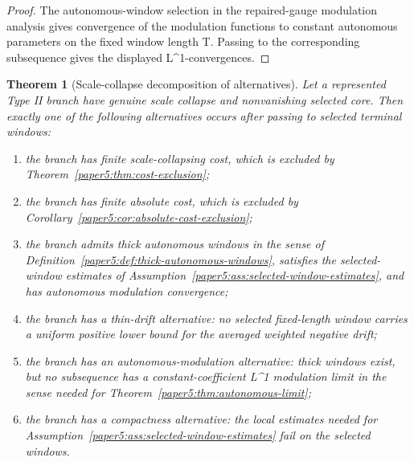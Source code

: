 \documentclass[11pt]{amsart}
\def\({}%
\def\){}%
\theoremstyle{plain}
\newtheorem{theorem}{Theorem}[section]
\theoremstyle{definition}
\theoremstyle{remark}
\begin{document}
\begin{proof}
The autonomous-window selection in the repaired-gauge modulation analysis gives convergence
of the modulation functions to constant autonomous parameters on the fixed window length
\(T\).  Passing to the corresponding subsequence gives the displayed
\(L^1\)-convergences.
\end{proof}

\begin{theorem}[Scale-collapse decomposition of alternatives]\label{paper5:thm:scale-collapse-stratification}
Let a represented Type II branch have genuine scale collapse and nonvanishing selected core.
Then exactly one of the following alternatives occurs after passing to selected terminal
windows:
\begin{enumerate}[label=(\roman*)]
  \item the branch has finite scale-collapsing cost, which is excluded by
  Theorem~\ref{paper5:thm:cost-exclusion};
  \item the branch has finite absolute cost, which is excluded by
  Corollary~\ref{paper5:cor:absolute-cost-exclusion};
  \item the branch admits thick autonomous windows in the sense of
  Definition~\ref{paper5:def:thick-autonomous-windows}, satisfies the selected-window estimates of
  Assumption~\ref{paper5:ass:selected-window-estimates}, and has autonomous modulation convergence;
  \item the branch has a thin-drift alternative: no selected fixed-length window carries a uniform
  positive lower bound for the averaged weighted negative drift;
  \item the branch has an autonomous-modulation alternative: thick windows exist, but no subsequence
  has a constant-coefficient \(L^1\) modulation limit in the sense needed for
  Theorem~\ref{paper5:thm:autonomous-limit};
  \item the branch has a compactness alternative: the local estimates needed for
  Assumption~\ref{paper5:ass:selected-window-estimates} fail on the selected windows.
\end{enumerate}
\end{theorem}
\end{document}
